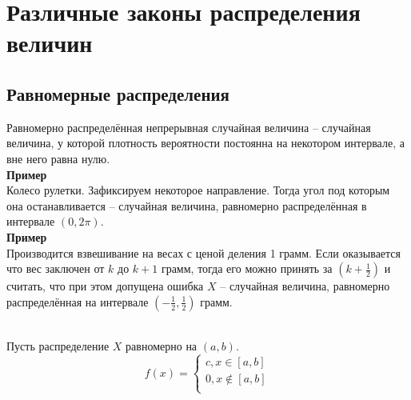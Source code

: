 \documentclass[russian, 12pt, fleqn]{article}
\begin{document}
\section{Различные законы распределения величин}
\subsection{Равномерные распределения}
\noindent
Равномерно распределённая непрерывная случайная величина -- случайная величина, у которой плотность вероятности постоянна на некотором интервале, а вне него равна нулю.\\
\textbf{Пример\ }\\
Колесо рулетки. Зафиксируем некоторое направление. Тогда угол под которым она останавливается -- случайная величина, равномерно распределённая в интервале $(0, 2\pi)$.\\
\textbf{Пример\ }\\
Производится взвешивание на весах с ценой деления 1 грамм. Если оказывается что вес заключен от $k$ до $k + 1$ грамм, тогда его можно принять за $(k + \frac{1}{2})$ и считать, что при этом допущена ошибка $X$ -- случайная величина, равномерно распределённая на интервале $(-\frac{1}{2}, \frac{1}{2})$ грамм.\\
\\
Пусть распределение $X$ равномерно на $(a, b)$.\\
\begin{equation*} 
f(x)=
 \begin{cases}
   c,   x \in [a, b]\\
   0 , x \notin [a, b]\\
 \end{cases}
\end{equation*}\\
\end{document}
